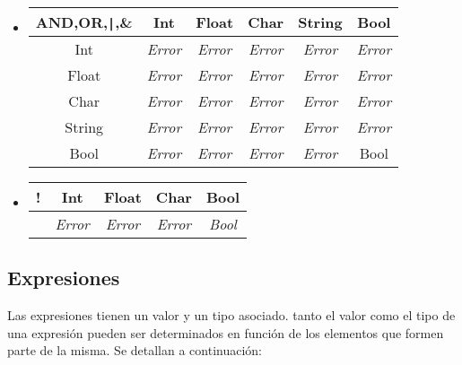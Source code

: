 \documentclass[12pt, spanish]{report}
\begin{document}
\begin{itemize}
\item
\begin{tabular}{|c||ccccc|}
	    \hline
AND,OR,\texttt{|},\& &  Int  & Float & Char & String & Bool  \\ 
	    \hline \hline
Int         & \emph{Error} & \emph{Error} & \emph{Error} & \emph{Error} & \emph{Error} \\
Float       & \emph{Error} & \emph{Error} & \emph{Error} & \emph{Error} & \emph{Error} \\
Char        & \emph{Error} & \emph{Error} & \emph{Error} & \emph{Error} & \emph{Error} \\
String      & \emph{Error} & \emph{Error} & \emph{Error} & \emph{Error} & \emph{Error} \\
Bool        & \emph{Error} & \emph{Error} & \emph{Error} & \emph{Error} & Bool \\
	\hline
\end{tabular}

\item
\begin{tabular}{|c||cccc|}
 \hline
!       &  Int  & Float & Char  & Bool  \\ 
 \hline \hline
        & \emph{Error} & \emph{Error} & \emph{Error} & \emph{Bool} \\
	\hline
\end{tabular}
\end{itemize}

\subsection{Expresiones}
\label{sec:expr}

Las expresiones tienen un valor y un tipo asociado. tanto el valor
como el tipo de una expresi\'on pueden ser determinados en funci\'on de
los elementos que formen parte de la misma.
Se detallan a continuaci\'on:
\end{document}
